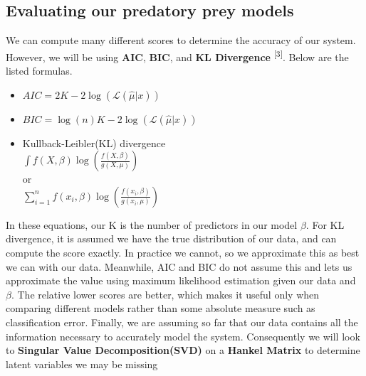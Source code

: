 \documentclass[12pt]{article}
\begin{document}
	\subsection{Evaluating our predatory prey models}
	We can compute many different scores to determine the accuracy of our system. However, we will be using \textbf{AIC}, \textbf{BIC}, and \textbf{KL Divergence} \textsuperscript{[3]}. Below are the listed formulas.
	
	\begin{itemize}
		\item 
		$AIC = 2K - 2\log(\mathcal{L} (\hat{\mu}\vert x)) $
		\item 
		$BIC = \log(n)K - 2\log(\mathcal{L} (\hat{\mu}\vert x)) $ 
		\item Kullback-Leibler(KL) divergence
		\\
		$\int f(X,\beta)\log(\frac{f(X,\beta)}{g(X,\mu)})$\\
		or
		\\
		$\sum_{i=1}^n f(x_i,\beta)\log(\frac{f(x_i,\beta)}{g(x_i,\mu)})$
	\end{itemize}

	In these equations, our K is the number of predictors in our model $\beta$. For KL divergence, it is assumed we have the true distribution of our data, and can compute the score exactly. In practice we cannot, so we approximate this as best we can with our data. Meanwhile, AIC and BIC do not assume this and lets us approximate the value using maximum likelihood estimation given our data and $\beta$. The relative lower scores are better, which makes it useful only when comparing different models rather than some absolute measure such as classification error. Finally, we are assuming so far that our data contains all the information necessary to accurately model the system. Consequently we will look to \textbf{Singular Value Decomposition(SVD)} on a \textbf{Hankel Matrix} to determine latent variables we may be missing
	
\end{document}
